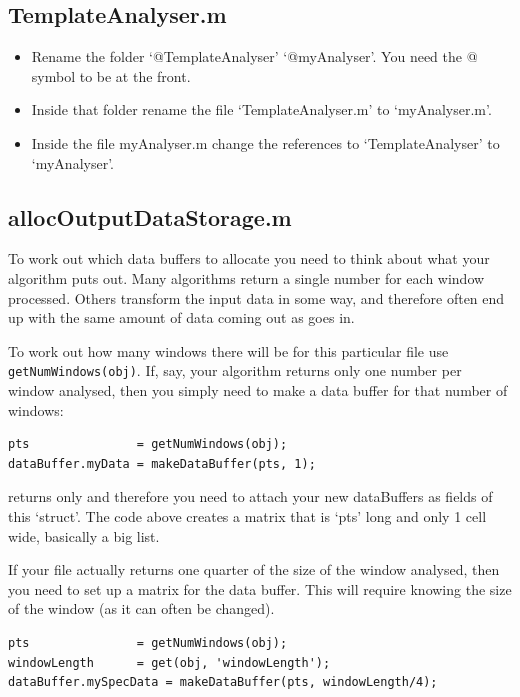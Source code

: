\documentclass{article}
\begin{document}
\subsection{TemplateAnalyser.m}

\begin{itemize}
	\item Rename the folder `@TemplateAnalyser' `@myAnalyser'. You need the @ symbol to be at the front.  
	\item Inside that folder rename the file `TemplateAnalyser.m' to `myAnalyser.m'. 
	\item Inside the file myAnalyser.m change the references to `TemplateAnalyser' to `myAnalyser'.
\end{itemize}

\subsection{allocOutputDataStorage.m}

To work out which data buffers to allocate you need to think about what your algorithm puts out. Many algorithms return a single number for each window  processed. Others transform the input data in some way, and therefore often end up with the same amount of data coming out as goes in. 

To work out how many windows there will be for this particular file use \texttt{getNumWindows(obj)}. If, say, your algorithm returns only one number per window analysed, then you simply need to make a data buffer for that number of windows:

\begin{verbatim}
pts               = getNumWindows(obj); 
dataBuffer.myData = makeDataBuffer(pts, 1);
\end{verbatim}

 returns only  and therefore you need to attach your new dataBuffers as fields of this `struct'. The code above creates a matrix that is `pts' long and only 1 cell wide, basically a big list.

If your file actually returns one quarter of the size of the window analysed, then you need to set up a matrix for the data buffer. This will require knowing the size of the window (as it can often be changed). 

\begin{verbatim}
pts               = getNumWindows(obj);
windowLength      = get(obj, 'windowLength'); 
dataBuffer.mySpecData = makeDataBuffer(pts, windowLength/4);
\end{verbatim}
\end{document}
